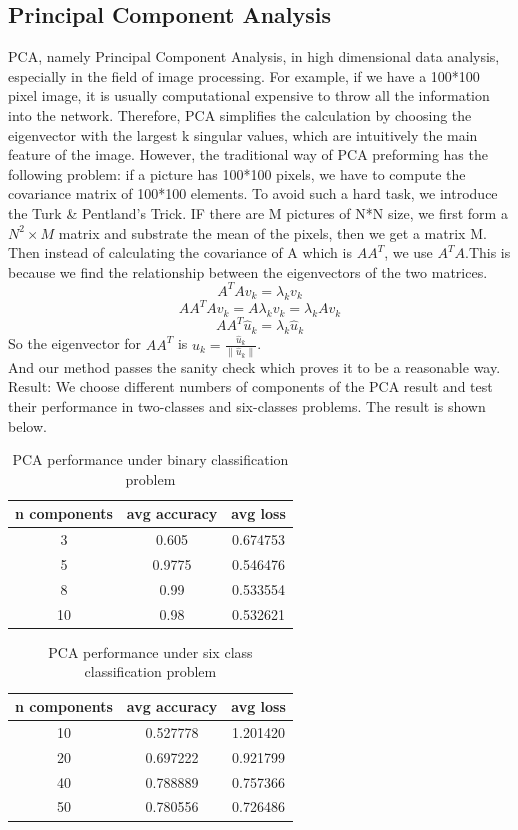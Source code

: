 \documentclass{article} %
\begin{document}
\subsection {Principal Component Analysis}
PCA, namely Principal Component Analysis, in high dimensional data analysis, especially in the field of image processing. For example, if we have a 100*100 pixel image, it is usually computational expensive to throw all the information into the network. Therefore, PCA simplifies the calculation by choosing the eigenvector with the largest k singular values, which are intuitively the main feature of the image. However, the traditional way of PCA preforming has the following problem: if a picture has 100*100 pixels, we have to compute the covariance matrix of 100*100 elements. To avoid such a hard task, we introduce the Turk \& Pentland’s Trick. IF there are M pictures of N*N size, we first form a  $N^2 \times M$ matrix and substrate the mean of the pixels, then we get a matrix M.
Then instead of calculating the covariance of A which is $AA^T$, we use $A^TA$.This is because we find the relationship between the eigenvectors of the two matrices.
$$A^{T} A v_{k}=\lambda_{k} v_{k}$$
$$A A^{T} A v_{k}=A \lambda_{k} v_{k}=\lambda_{k} A v_{k}$$
$$A A^{T} \hat{u}_{k}=\lambda_{k} \hat{u}_{k}$$
So the eigenvector for $A A^{T}$ is $u_{k}=\frac{\hat{u}_{k}}{\left\|\hat{u}_{k}\right\|}$.\\
And our method passes the sanity check which proves it to be a reasonable way.
Result: We choose different numbers of components of the PCA result and test their performance in two-classes and six-classes problems. The result is shown below.
\begin{table}[!htbp]
\centering
\begin{tabular}{ccc}
\hline
n components&avg accuracy& avg loss\\
\hline
3& 0.605& 0.674753\\
5& 0.9775& 0.546476\\
8&0.99&0.533554\\
10&0.98& 0.532621\\
\hline
\end{tabular}
\caption{PCA performance under binary classification problem}
\end{table}
\begin{table}[!htbp]
	\centering
	\begin{tabular}{ccc}
		\hline
		n components&avg accuracy& avg loss\\
		\hline
		10& 0.527778& 1.201420\\
		20& 0.697222& 0.921799\\
		40& 0.788889& 0.757366\\
		50& 0.780556& 0.726486\\
		\hline
	\end{tabular}
	\caption{PCA performance under six class classification problem}
\end{table}
\end{document}
